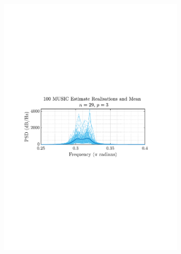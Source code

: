 \documentclass[12pt]{article}
\numberwithin{equation}{section}
\begin{document}
\begin{figure}[H]
\begin{subfigure}{0.49\textwidth}
			\includegraphics[trim={2.2cm 11.2cm 3.15cm  11.2cm}, clip, width=\textwidth]{../MATLAB/figures/q1_3e_fig05.pdf} 
		\end{subfigure}
		\begin{subfigure}{0.49\textwidth}
			\centering

\end{subfigure}
\end{figure}
\end{document}
